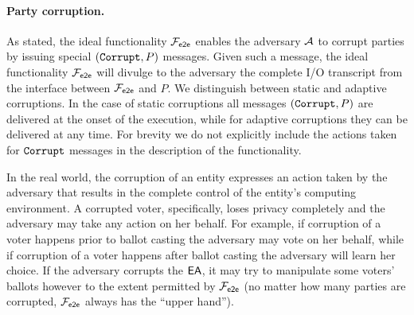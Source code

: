 \paragraph{Party corruption.} As stated, the ideal functionality
$\mathcal{F}_{\mathsf{e2e}}$ enables the adversary $\mathcal{A}$ to corrupt parties by issuing
special $(\mathtt{Corrupt}, P)$ messages.  Given such a message, the ideal
functionality $\mathcal{F}_{\mathsf{e2e}}$ will divulge to the adversary the complete I/O
transcript from the interface between $\mathcal{F}_{\mathsf{e2e}}$ and $P$. We distinguish
between static and adaptive corruptions. In the case of static
corruptions all messages $(\mathtt{Corrupt},P)$ are delivered at the onset of
the execution, while for adaptive corruptions they can be delivered at
any time.  For brevity we do not explicitly include the actions taken
for $\mathtt{Corrupt}$ messages in the description of the functionality.

In the real world, the corruption of an entity expresses an action
taken by the adversary that results in the complete control of the
entity's computing environment. A corrupted voter, specifically, loses
privacy completely and the adversary may take any action on her
behalf. For example, if corruption of a voter happens prior to ballot
casting the adversary may vote on her behalf, while if corruption of a
voter happens after ballot casting the adversary will learn her
choice. If the adversary corrupts the $\mathsf{EA}$, it may try to manipulate
some voters' ballots however to the extent permitted by $\mathcal{F}_{\mathsf{e2e}}$ (no
matter how many parties are corrupted, $\mathcal{F}_{\mathsf{e2e}}$ always has the ``upper
hand'').

